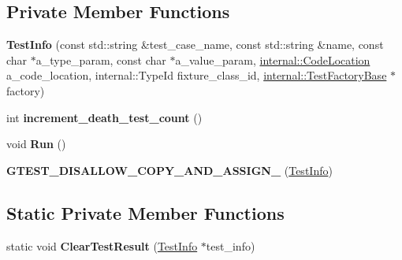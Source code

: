 \subsection*{Private Member Functions}
\begin{DoxyCompactItemize}
\item 
\mbox{\label{classtesting_1_1_test_info_afc4a66e2d2491f09e8549c71514c3d78}} 
{\bfseries Test\+Info} (const std\+::string \&test\+\_\+case\+\_\+name, const std\+::string \&name, const char $\ast$a\+\_\+type\+\_\+param, const char $\ast$a\+\_\+value\+\_\+param, \mbox{\hyperlink{structtesting_1_1internal_1_1_code_location}{internal\+::\+Code\+Location}} a\+\_\+code\+\_\+location, internal\+::\+Type\+Id fixture\+\_\+class\+\_\+id, \mbox{\hyperlink{classtesting_1_1internal_1_1_test_factory_base}{internal\+::\+Test\+Factory\+Base}} $\ast$factory)
\item 
\mbox{\label{classtesting_1_1_test_info_a70c9509202a6f95fbc26704ce13efb63}} 
int {\bfseries increment\+\_\+death\+\_\+test\+\_\+count} ()
\item 
\mbox{\label{classtesting_1_1_test_info_ade784915e9be3a01e3a6ef509b77d6c9}} 
void {\bfseries Run} ()
\item 
\mbox{\label{classtesting_1_1_test_info_a49607d4547e374b5248e4200d9192817}} 
{\bfseries G\+T\+E\+S\+T\+\_\+\+D\+I\+S\+A\+L\+L\+O\+W\+\_\+\+C\+O\+P\+Y\+\_\+\+A\+N\+D\+\_\+\+A\+S\+S\+I\+G\+N\+\_\+} (\mbox{\hyperlink{classtesting_1_1_test_info}{Test\+Info}})
\end{DoxyCompactItemize}
\subsection*{Static Private Member Functions}
\begin{DoxyCompactItemize}
\item 
\mbox{\label{classtesting_1_1_test_info_ac6d80865a3e68478aaf167058e6ca5c2}} 
static void {\bfseries Clear\+Test\+Result} (\mbox{\hyperlink{classtesting_1_1_test_info}{Test\+Info}} $\ast$test\+\_\+info)
\end{DoxyCompactItemize}
